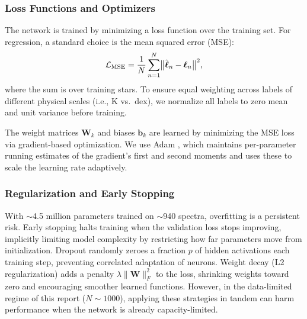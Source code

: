 \documentclass[10pt,preprint2]{aastex}
\begin{document}

\subsubsection{Loss Functions and Optimizers}

The network is trained by minimizing a loss function over the training set. For regression, a standard choice is the mean squared error (MSE):
\begin{equation}
  \mathcal{L}_{\rm MSE} = \frac{1}{N}\sum_{n=1}^{N} \bigl\|\hat{\boldsymbol{\ell}}_n - \boldsymbol{\ell}_n\bigr\|^2,
  \label{eq:mse_loss}
\end{equation}
where the sum is over training stars.
To ensure equal weighting across labels of different physical scales (i.e., K vs.\ dex), we normalize all labels to zero mean and unit variance before training.

The weight matrices $\mathbf{W}_k$ and biases $\mathbf{b}_k$ are learned by minimizing the MSE loss via gradient-based optimization. We use Adam \citep{Kingma2015}, which maintains per-parameter running estimates of the gradient's first and second moments and uses these to scale the learning rate adaptively.

\subsubsection{Regularization and Early Stopping}

With $\sim$4.5 million parameters trained on $\sim$940 spectra, overfitting is a persistent risk. Early stopping halts training when the validation loss stops improving, implicitly limiting model complexity by restricting how far parameters move from initialization. Dropout \citep{Srivastava2014} randomly zeroes a fraction $p$ of hidden activations each training step, preventing correlated adaptation of neurons. Weight decay (L2 regularization) adds a penalty $\lambda \|\mathbf{W}\|_F^2$ to the loss, shrinking weights toward zero and encouraging smoother learned functions. However, in the data-limited regime of this report ($N \sim 1000$), applying these strategies in tandem can harm performance when the network is already capacity-limited.
\end{document}
